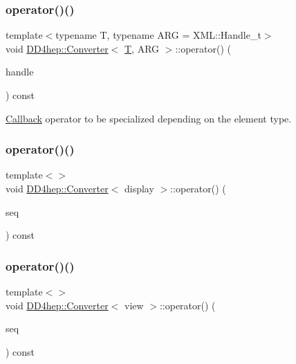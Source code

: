 \subsubsection{\texorpdfstring{operator()()}{operator()()}\hspace{0.1cm}{\footnotesize\ttfamily [2/22]}}
{\footnotesize\ttfamily template$<$typename T, typename A\+RG = X\+M\+L\+::\+Handle\+\_\+t$>$ \\
void \hyperlink{struct_d_d4hep_1_1_converter}{D\+D4hep\+::\+Converter}$<$ \hyperlink{class_t}{T}, A\+RG $>$\+::operator() (\begin{DoxyParamCaption}\item[{A\+RG}]{handle }\end{DoxyParamCaption}) const}



\hyperlink{class_d_d4hep_1_1_callback}{Callback} operator to be specialized depending on the element type. 

\hypertarget{struct_d_d4hep_1_1_converter_ac674592eedfa6bef641f368652b04a33}{}\label{struct_d_d4hep_1_1_converter_ac674592eedfa6bef641f368652b04a33} 
\subsubsection{\texorpdfstring{operator()()}{operator()()}\hspace{0.1cm}{\footnotesize\ttfamily [3/22]}}
{\footnotesize\ttfamily template$<$$>$ \\
void \hyperlink{struct_d_d4hep_1_1_converter}{D\+D4hep\+::\+Converter}$<$ display $>$\+::operator() (\begin{DoxyParamCaption}\item[{\hyperlink{_det_factory_helper_8h_ac13b3c79d2bc9214ff0cf5b8dc43dda6}{xml\+\_\+h}}]{seq }\end{DoxyParamCaption}) const}

\hypertarget{struct_d_d4hep_1_1_converter_a353c37086d6bfad79d74dbb989c1a6ce}{}\label{struct_d_d4hep_1_1_converter_a353c37086d6bfad79d74dbb989c1a6ce} 
\subsubsection{\texorpdfstring{operator()()}{operator()()}\hspace{0.1cm}{\footnotesize\ttfamily [4/22]}}
{\footnotesize\ttfamily template$<$$>$ \\
void \hyperlink{struct_d_d4hep_1_1_converter}{D\+D4hep\+::\+Converter}$<$ view $>$\+::operator() (\begin{DoxyParamCaption}\item[{\hyperlink{_det_factory_helper_8h_ac13b3c79d2bc9214ff0cf5b8dc43dda6}{xml\+\_\+h}}]{seq }\end{DoxyParamCaption}) const}

